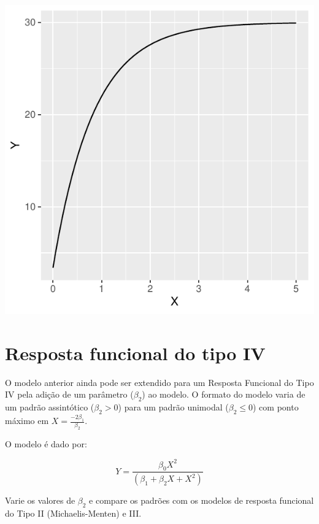 \documentclass[
]{book}
\begin{document}
\begin{center}\includegraphics{probest-cambientais_files/figure-latex/unnamed-chunk-226-1} \end{center}

\hypertarget{resposta-funcional-do-tipo-iv}{%
\section{Resposta funcional do tipo IV}\label{resposta-funcional-do-tipo-iv}}

O modelo anterior ainda pode ser extendido para um Resposta Funcional do Tipo IV pela adição de um parâmetro (\(\beta_2\)) ao modelo. O formato do modelo varia de um padrão assintótico (\(\beta_2 > 0\)) para um padrão unimodal (\(\beta_2 \le 0\)) com ponto máximo em \(X = \frac{-2\beta_1}{\beta_2}\).

O modelo é dado por:

\[Y = \frac{\beta_0 X^2}{(\beta_1 + \beta_2 X + X^2)}\]

Varie os valores de \(\beta_2\) e compare os padrões com os modelos de resposta funcional do Tipo II (Michaelis-Menten) e III.
\end{document}

